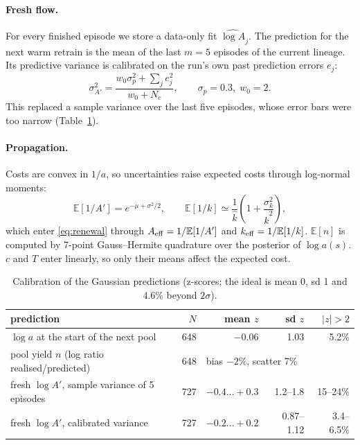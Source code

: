 \documentclass[11pt,a4paper]{article}
\newcommand{\E}{\mathbb{E}}
\begin{document}
\paragraph{Fresh flow.} For every finished episode we store a data-only fit
$\widehat{\log A}_j$. The prediction for the next warm retrain is the mean of
the last $m=5$ episodes of the current lineage. Its predictive variance is
calibrated on the run's own past prediction errors $e_j$:
\begin{equation}
  \sigma^2_{A'} = \frac{w_0\sigma_p^2 + \sum_j e_j^2}{w_0 + N_e},
  \qquad \sigma_p = 0.3,\; w_0=2 .
\end{equation}
This replaced a sample variance over the last five episodes, whose error bars
were too narrow (Table~\ref{tab:calib}).

\paragraph{Propagation.} Costs are convex in $1/a$, so uncertainties raise
expected costs through log-normal moments:
\begin{equation}
  \E[1/A'] = e^{-\mu+\sigma^2/2},\qquad
  \E[1/k]\simeq \frac{1}{\hat k}\left(1+\frac{\sigma_k^2}{\hat k^2}\right),
\end{equation}
which enter \eqref{eq:renewal} through $A_{\rm eff}=1/\E[1/A']$ and
$k_{\rm eff}=1/\E[1/k]$. $\E[n]$ is computed by 7-point Gauss--Hermite
quadrature over the posterior of $\log a(s)$. $c$ and $T$ enter linearly, so
only their means affect the expected cost.

\begin{table}[htbp]
\centering
\caption{Calibration of the Gaussian predictions (z-scores; the ideal is mean
0, sd 1 and 4.6\% beyond $2\sigma$).}
\label{tab:calib}
\begin{tabular}{lrrrr}
\toprule
prediction & $N$ & mean $z$ & sd $z$ & $|z|>2$ \\
\midrule
$\log a$ at the start of the next pool & 648 & $-0.06$ & 1.03 & 5.2\% \\
pool yield $n$ (log ratio realised/predicted) & 648 & \multicolumn{3}{l}{bias $-2\%$, scatter 7\%} \\
fresh $\log A'$, sample variance of 5 episodes & 727 & $-0.4\ldots+0.3$ & 1.2--1.8 & 15--24\% \\
fresh $\log A'$, calibrated variance & 727 & $-0.2\ldots+0.2$ & 0.87--1.12 & 3.4--6.5\% \\
\bottomrule
\end{tabular}
\end{table}
\end{document}

